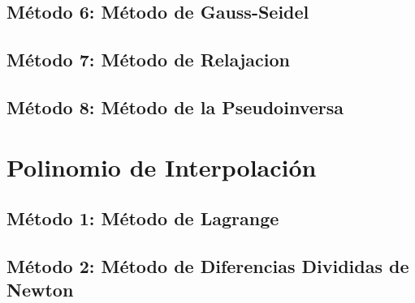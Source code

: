 \documentclass[10pt,a4paper]{article}
\begin{document}
	\subsection{Método 6: Método de Gauss-Seidel}
	
	
					
	\subsection{Método 7: Método de Relajacion}

	
							
	\subsection{Método 8: Método de la Pseudoinversa}
	
	
	
	\section{Polinomio de Interpolación}
	
	\subsection{Método 1: Método de Lagrange}

		
	
	\subsection{Método 2: Método de Diferencias Divididas de Newton}
	
\end{document}
